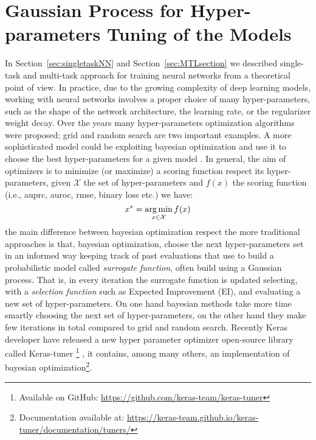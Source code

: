 \section{Gaussian Process for Hyper-parameters Tuning of the Models}
In Section~\ref{sec:singletaskNN} and Section~\ref{sec:MTLsection} we
described single-task and multi-task approach for training neural
networks from a theoretical point of view. In practice, due to the
growing complexity of deep learning models, working with neural networks
involves a proper choice of many hyper-parameters, such as the shape of
the network architecture, the learning rate, or the regularizer weight
decay. Over the years many hyper-parameters optimization algorithms were
proposed; grid and random search \cite{BergstraB12} are two important
examples. A more sophisticated model could be exploiting bayesian optimization
and use it to choose the best hyper-parameters for a given model
\cite{SnoekGP}. In general, the aim of optimizers is to minimize (or
maximize) a scoring function respect its hyper-parameters, given
$\mathcal{X}$ the set of hyper-parameters and $f(x)$ the scoring function
(i.e., auprc, auroc, rmse, binary loss etc.) we have: 
\[ 
x^* =  \operatorname*{arg\,min}_{x \in \mathcal{X}} f(x) 
\]
the main difference between bayesian optimization respect the more
traditional approaches is that, bayesian optimization, choose the next
hyper-parameters set in an informed way keeping track of past evaluations
that use to build a probabilistic model called \emph{surrogate function}, often build using a Gaussian process. That is, in every
iteration the surrogate function is updated selecting, with a
\emph{selection function} such as Expected Improvement (EI), and
evaluating a new set of hyper-parameters. On one hand bayesian methods
take more time smartly choosing the next set of hyper-parameters, on the other hand they make few iterations in total compared to grid and random search. 
Recently Keras developer have released a new hyper parameter optimizer
open-source library called Keras-tuner \footnote{Available on GitHub:
\url{https://github.com/keras-team/keras-tuner}}
\cite{omalley2019kerastuner}, it contains, among many others, an
implementation of bayesian optimization\footnote{Documentation available
at: \url{https://keras-team.github.io/keras-tuner/documentation/tuners/}}.

